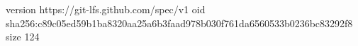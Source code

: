 version https://git-lfs.github.com/spec/v1
oid sha256:c89c05ed59b1ba8320aa25a6b3faad978b030f761da6560533b0236bc83292f8
size 124
